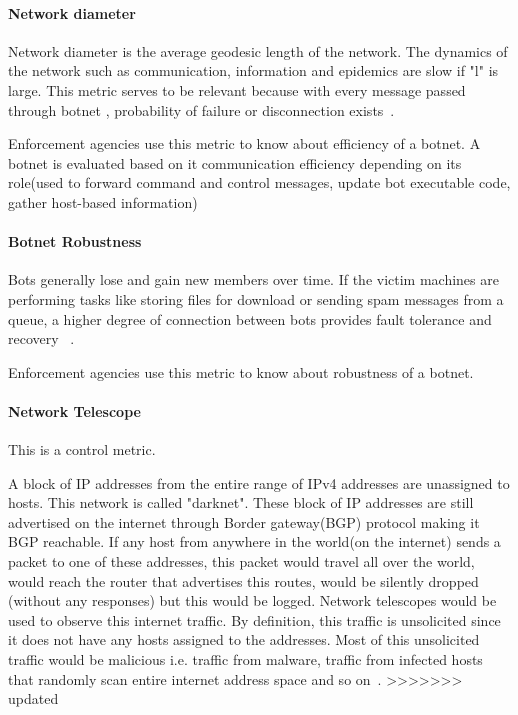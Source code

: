 \paragraph{ Network diameter }

Network diameter is the average geodesic length of the network.  The dynamics of the network such as communication, information and epidemics are slow if "l" is large. This metric serves to be relevant  because  with every message passed through botnet , probability of failure or disconnection exists~\cite{ Strayer08botnetdetection }.

Enforcement agencies use this metric to know about efficiency of a botnet. A botnet is evaluated based on it communication efficiency depending on its role(used to forward command and control messages, update bot executable code, gather host-based information)

\paragraph{ Botnet Robustness }

Bots generally lose and gain new members over time. If the victim machines are performing  tasks like storing files for download or sending spam messages from a queue, a higher degree of connection  between bots provides fault tolerance and  recovery ~\cite{ Strayer08botnetdetection }.

Enforcement agencies use this metric to know about robustness of a botnet.

\paragraph{Network Telescope}
This is a control metric.

A block of IP addresses from the entire range of IPv4 addresses are unassigned to hosts. This network is called "darknet". These block of IP addresses are still advertised on the internet through Border gateway(BGP) protocol making it BGP reachable. If any host from anywhere in the world(on the internet) sends a packet to one of these addresses, this packet would travel all over the world, would reach the router that advertises this routes, would be silently dropped (without any responses) but this would be logged. Network telescopes would be used to observe this internet traffic. By definition, this traffic is unsolicited since it does not have any hosts assigned to the addresses. Most of this unsolicited traffic would be malicious i.e. traffic from malware, traffic from infected hosts that randomly scan entire internet address space and so on~\cite{AM2014}.
>>>>>>> updated

